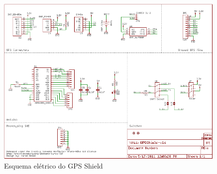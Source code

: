 {\clearpage

\begin{figure}[!htb]
			\centering
			\includegraphics[width=0.99\textwidth]{figures/schemaGPS.png}
			\caption{Esquema elétrico do GPS Shield}
			\label{fig:esquemagpdshield}
\end{figure}
\clearpage

\recalctypearea
}